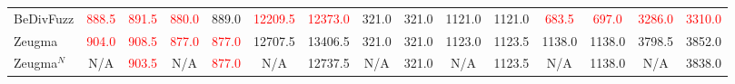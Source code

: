 \begin{table}[t]
\begin{tabular}{l|cc|cc|cc|cc|cc|cc|cc}
    BeDivFuzz & \textcolor{red}{888.5} & \textcolor{red}{891.5} & \textcolor{red}{880.0} & 889.0 & \textcolor{red}{12209.5} & \textcolor{red}{12373.0} & \cellcolor{blue!15}321.0 & \cellcolor{blue!15}321.0 & 1121.0 & 1121.0 & \textcolor{red}{683.5} & \textcolor{red}{697.0} & \textcolor{red}{3286.0} & \textcolor{red}{3310.0} \\
    Zeugma & \textcolor{red}{904.0} & \textcolor{red}{908.5} & \textcolor{red}{877.0} & \textcolor{red}{877.0} & \cellcolor{blue!15}\textcolor{\chigher}{12707.5} & \cellcolor{blue!15}\textcolor{\chigher}{13406.5} & \cellcolor{blue!15}321.0 & \cellcolor{blue!15}321.0 & \cellcolor{blue!15}\textcolor{\chigher}{1123.0} & \cellcolor{blue!15}\textcolor{\chigher}{1123.5} & \cellcolor{blue!15}\textcolor{\chigher}{1138.0} & \cellcolor{blue!15}1138.0 & \cellcolor{blue!15}\textcolor{\chigher}{3798.5} & \cellcolor{blue!15}\textcolor{\chigher}{3852.0} \\
    Zeugma$^{N}$ & N/A & \textcolor{red}{903.5} & N/A & \textcolor{red}{877.0} & N/A & \textcolor{\chigher}{12737.5} & N/A & 321.0 & N/A & \textcolor{\chigher}{1123.5} & N/A & 1138.0 & N/A & \textcolor{\chigher}{3838.0} \\
    \bottomrule
    \end{tabular}
\end{table}